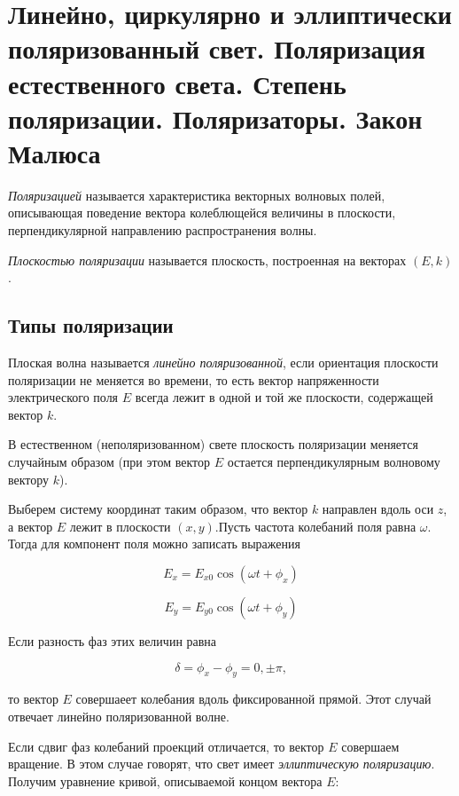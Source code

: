 


\section{Линейно, циркулярно и эллиптически поляризованный свет. Поляризация естественного света. Степень поляризации. Поляризаторы. Закон Малюса}

\textit{Поляризацией} называется характеристика векторных волновых полей, описывающая поведение вектора колеблющейся величины в плоскости, перпендикулярной направлению распространения волны.

\textit{Плоскостью поляризации} называется плоскость, построенная на векторах $(E,k)$.
\subsection{Типы поляризации}
Плоская волна называется \textit{линейно поляризованной}, если ориентация плоскости поляризации не меняется во времени, то есть вектор напряженности электрического поля $E$ всегда лежит в одной и той же плоскости, содержащей вектор $k$.

В естественном (неполяризованном) свете плоскость поляризации меняется случайным образом (при этом вектор $E$ остается перпендикулярным волновому вектору $k$).

Выберем систему координат таким образом, что вектор $k$ направлен вдоль оси $z$, а вектор $E$ лежит в плоскости $(x, y)$.Пусть частота колебаний поля равна $\omega$. Тогда для компонент поля можно записать выражения

\begin{equation*}
    E_x = E_{x0}\cos(\omega t +\phi_x)
\end{equation*}


\begin{equation*}
    E_y = E_{y0}\cos(\omega t +\phi_y)
\end{equation*}

Если разность фаз этих величин равна 

\begin{equation*}
    \delta = \phi_x - \phi_y = 0, \pm\pi,
\end{equation*}


то вектор $E$ совершаеет колебания вдоль фиксированной прямой. Этот случай отвечает линейно поляризованной волне.

Если сдвиг фаз колебаний проекций отличается, то вектор $E$ совершаем вращение. В этом случае говорят, что свет имеет \textit{эллиптическую поляризацию}. Получим уравнение кривой, описываемой концом вектора $E$:

